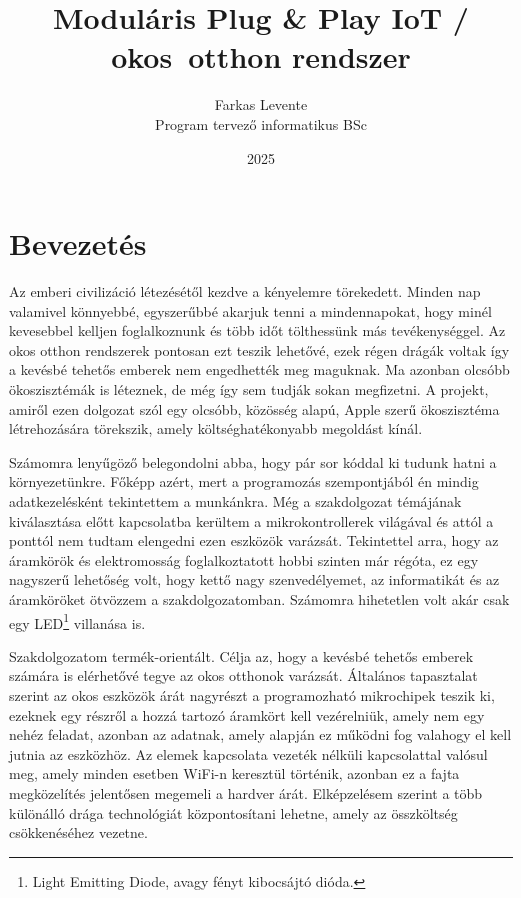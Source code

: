 \documentclass{thesis-ekf}
\theoremstyle{definition}
\theoremstyle{remark}
\begin{document}
	
	\title{Moduláris Plug \& Play IoT / okos~otthon rendszer}
	\author{Farkas Levente\\Program tervező informatikus BSc}
	\date{2025}
	\maketitle
	\tableofcontents
	\chapter*{Bevezetés}
	
	Az emberi civilizáció létezésétől kezdve a kényelemre törekedett. Minden nap valamivel könnyebbé, egyszerűbbé akarjuk tenni a mindennapokat, hogy minél kevesebbel kelljen foglalkoznunk és több időt tölthessünk más tevékenységgel. Az okos otthon rendszerek pontosan ezt teszik lehetővé, ezek régen drágák voltak így  a kevésbé tehetős emberek nem engedhették meg maguknak. Ma azonban olcsóbb ökoszisztémák is léteznek, de még így sem tudják sokan megfizetni. A projekt, amiről ezen dolgozat szól egy olcsóbb, közösség alapú, Apple szerű ökoszisztéma létrehozására törekszik, amely költséghatékonyabb megoldást kínál.
	
	Számomra lenyűgöző belegondolni abba, hogy pár sor kóddal ki tudunk hatni a környezetünkre. Főképp azért, mert a programozás szempontjából én mindig adatkezelésként tekintettem a munkánkra. Még a szakdolgozat témájának kiválasztása előtt kapcsolatba kerültem a mikrokontrollerek világával és attól a ponttól nem tudtam elengedni ezen eszközök varázsát. Tekintettel arra, hogy az áramkörök és elektromosság foglalkoztatott hobbi szinten már régóta, ez egy nagyszerű lehetőség volt, hogy kettő nagy szenvedélyemet, az informatikát és az áramköröket ötvözzem a szakdolgozatomban. Számomra hihetetlen volt akár csak egy LED\footnote{Light Emitting Diode, avagy fényt kibocsájtó dióda.} villanása is.
	
	Szakdolgozatom termék-orientált. Célja az, hogy a kevésbé tehetős emberek számára is elérhetővé tegye az okos otthonok varázsát. Általános tapasztalat szerint az okos eszközök árát nagyrészt a programozható mikrochipek teszik ki, ezeknek egy részről a hozzá tartozó áramkört kell vezérelniük, amely nem egy nehéz feladat, azonban az adatnak, amely alapján ez működni fog valahogy el kell jutnia az eszközhöz. Az elemek kapcsolata vezeték nélküli kapcsolattal valósul meg, amely minden esetben WiFi-n keresztül történik, azonban ez a fajta megközelítés jelentősen megemeli a hardver árát. Elképzelésem szerint a több különálló drága technológiát központosítani lehetne, amely az összköltség csökkenéséhez vezetne.
	
\end{document}
